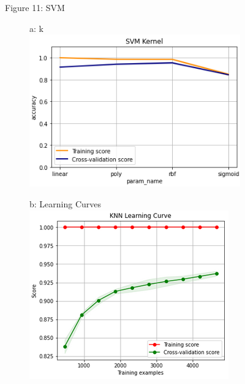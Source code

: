 \documentclass{article}
\begin{document}
\begin{figure}
	\centering
	Figure 11: SVM\\
	\begin{subfigure}{.30\textwidth}
		\centering
		a: k\\
		\includegraphics[width=\linewidth]{mnist_svm_kernel.png}
		
	\end{subfigure}
	\begin{subfigure}{.34\textwidth}
		\centering
		b: Learning Curves\\
		\includegraphics[width=\linewidth]{mnist_knn_learning.png}
		

\end{subfigure}
\end{figure}
\end{document}
